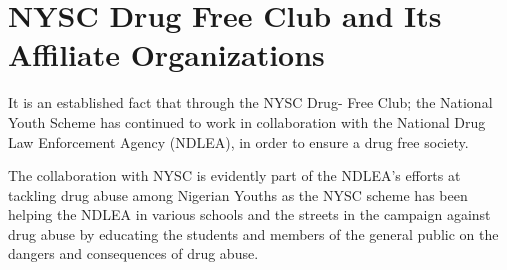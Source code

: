 \documentclass{report}
\begin{document}
\section{NYSC Drug Free Club and Its Affiliate Organizations}
It is an established fact that through the NYSC Drug- Free Club; the National Youth Scheme has continued to work in collaboration with the National Drug Law Enforcement Agency (NDLEA), in order to ensure a drug free society.

The collaboration with NYSC is evidently part of the NDLEA’s efforts at tackling drug abuse among Nigerian Youths as the NYSC scheme has been helping the NDLEA in various schools and the streets in the campaign against drug abuse by educating the students and members of the general public on the dangers and consequences of drug abuse.
\\
\end{document}
